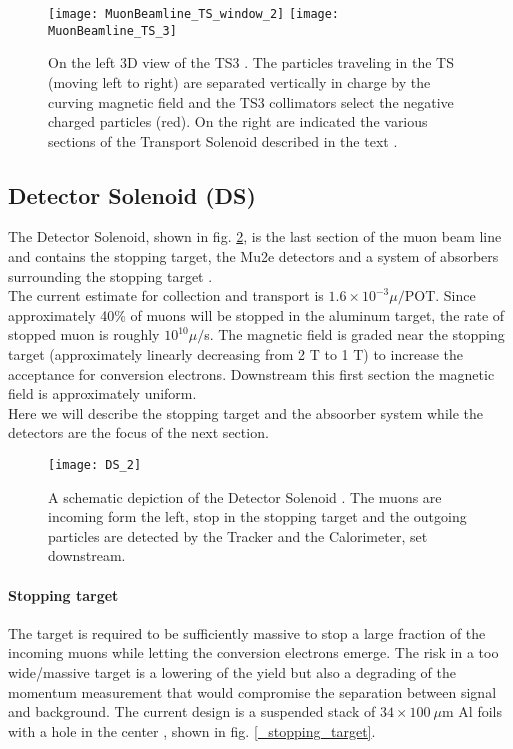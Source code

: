 \documentclass[12pt,a4paper,openright, oneside, titlepage]{book} %
\begin{document}
\begin{figure}[h!]
\centering
\texttt{[image: MuonBeamline\_TS\_window\_2]} \hfill
\texttt{[image: MuonBeamline\_TS\_3]}
\caption{On the left 3D view of the TS3 \cite{bob_mu2e}. The particles traveling in the TS (moving left to right) are separated vertically in charge by the curving magnetic field and the TS3 collimators select the negative charged particles (red). On the right are indicated the various sections of the Transport Solenoid described in the text \cite{TS}.}
\label{_TS3}
\end{figure}

\subsection{Detector Solenoid (DS)}
The Detector Solenoid, shown in fig. \ref{_DS}, is the last section of the muon beam line and contains the stopping target, the Mu2e detectors and a system of absorbers surrounding the stopping target \cite{DS}.\\
The current estimate for collection and transport is  $1.6\times 10^{-3}\mu/$POT. 
Since approximately 40\% of muons will be stopped in the aluminum target, the rate of stopped muon is roughly $10^{10}\mu/$s. 
The magnetic field is graded near the stopping target (approximately linearly decreasing from 2 T to 1 T) 
to increase the acceptance for conversion electrons. 
Downstream this first section the magnetic field is approximately uniform.\\
Here we will describe the stopping target and the absoorber system while the detectors are the focus of the next section.

\begin{figure}[h!]
\centering
\texttt{[image: DS\_2]}
\caption{A schematic depiction of the Detector Solenoid \cite{bob_mu2e}. The muons are incoming form the left, stop in the stopping target and the outgoing particles are detected by the Tracker and the Calorimeter, set downstream.}
\label{_DS}
\end{figure}

\paragraph{Stopping target} The target is required to be sufficiently massive to stop a large fraction of the incoming muons while letting the conversion electrons emerge. The risk in a too wide/massive target is a lowering of the yield but also a degrading of the momentum measurement that would compromise the separation between signal and background. 
The current design is a suspended stack of $34\times100\ \mu$m Al foils with a hole in the center \cite{stopping_target}, shown in fig. \ref{_stopping_target}.
\end{document}
